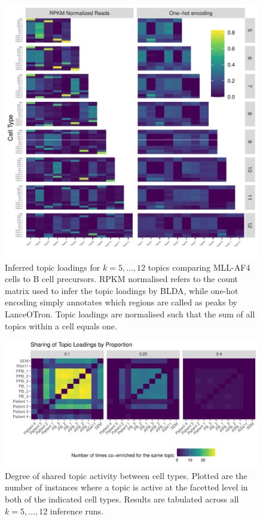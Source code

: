 \begin{figure}
    \centering
    \includegraphics[width=\textwidth]{plot/ch5/mll_all_topics.pdf}
    \caption{Inferred topic loadings for $k = 5, \ldots, 12$ topics comparing MLL-AF4 cells to B cell precursors. RPKM normalised refers to the count matrix used to infer the topic loadings by BLDA, while one-hot encoding simply annotates which regions are called as peaks by LanceOTron. Topic loadings are normalised such that the sum of all topics within a cell equals one.}
    \label{fig:mll_all_topic}
\end{figure}

\begin{figure}
    \centering
    \includegraphics[width=\textwidth]{plot/ch5/mll_coenriched.pdf}
    \caption{Degree of shared topic activity between cell types. Plotted are the number of instances where a topic is active at the facetted level in both of the indicated cell types. Results are tabulated across all $k=5, \ldots, 12$ inference runs.}
    \label{fig:mll_shared_topics}
\end{figure}

